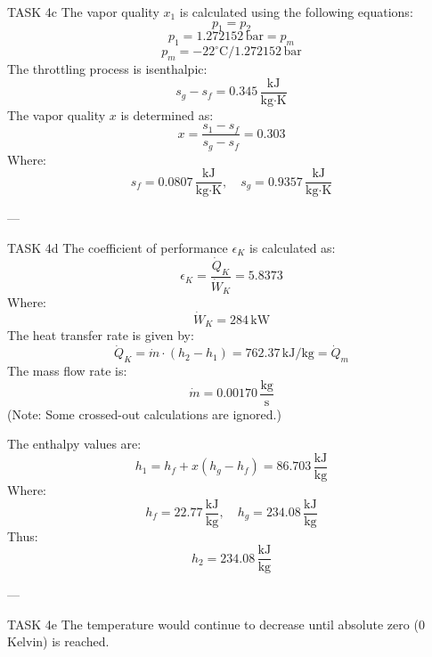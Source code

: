 TASK 4c  
The vapor quality \( x_1 \) is calculated using the following equations:  
\[
p_1 = p_2
\]
\[
p_1 = 1.272152 \, \text{bar} = p_m
\]
\[
p_m = -22^\circ\text{C} / 1.272152 \, \text{bar}
\]  
The throttling process is isenthalpic:  
\[
s_g - s_f = 0.345 \, \frac{\text{kJ}}{\text{kg·K}}
\]  
The vapor quality \( x \) is determined as:  
\[
x = \frac{s_1 - s_f}{s_g - s_f} = 0.303
\]  
Where:  
\[
s_f = 0.0807 \, \frac{\text{kJ}}{\text{kg·K}}, \quad s_g = 0.9357 \, \frac{\text{kJ}}{\text{kg·K}}
\]

---

TASK 4d  
The coefficient of performance \( \epsilon_K \) is calculated as:  
\[
\epsilon_K = \frac{\dot{Q}_K}{\dot{W}_K} = 5.8373
\]  
Where:  
\[
\dot{W}_K = 284 \, \text{kW}
\]  
The heat transfer rate is given by:  
\[
\dot{Q}_K = \dot{m} \cdot (h_2 - h_1) = 762.37 \, \text{kJ/kg} = \dot{Q}_m
\]  
The mass flow rate is:  
\[
\dot{m} = 0.00170 \, \frac{\text{kg}}{\text{s}}
\]  
(Note: Some crossed-out calculations are ignored.)  

The enthalpy values are:  
\[
h_1 = h_f + x(h_g - h_f) = 86.703 \, \frac{\text{kJ}}{\text{kg}}
\]  
Where:  
\[
h_f = 22.77 \, \frac{\text{kJ}}{\text{kg}}, \quad h_g = 234.08 \, \frac{\text{kJ}}{\text{kg}}
\]  
Thus:  
\[
h_2 = 234.08 \, \frac{\text{kJ}}{\text{kg}}
\]

---

TASK 4e  
The temperature would continue to decrease until absolute zero (0 Kelvin) is reached.